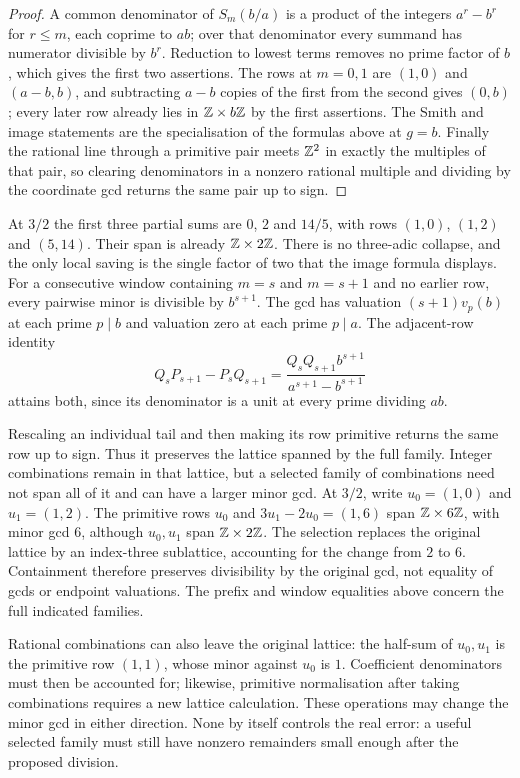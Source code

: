 \documentclass[11pt]{article}
\begin{document}
\begin{proof}
A common denominator of $S_m(b/a)$ is a product of the integers $a^r-b^r$ for
$r\le m$, each coprime to $ab$; over that denominator every summand has
numerator divisible by $b^r$. Reduction to lowest terms removes no prime factor
of $b$, which gives the first two assertions. The rows at $m=0,1$ are $(1,0)$
and $(a-b,b)$, and subtracting $a-b$ copies of the first from the second gives
$(0,b)$; every later row already lies in $\mathbb{Z}\times b\mathbb{Z}$ by the first
assertions. The Smith and image statements are the specialisation of the
formulas above at $g=b$. Finally the rational line through a primitive pair
meets $\mathbb{Z}^2$ in exactly the multiples of that pair, so clearing denominators in
a nonzero rational multiple and dividing by the coordinate gcd returns the same
pair up to sign.
\end{proof}

At $3/2$ the first three partial sums are $0$, $2$ and $14/5$, with rows
$(1,0)$, $(1,2)$ and $(5,14)$. Their span is already $\mathbb{Z}\times2\mathbb{Z}$. There is no
three-adic collapse, and the only local saving is the single factor of two that
the image formula displays. For a consecutive window containing $m=s$ and $m=s+1$ and no
earlier row, every pairwise minor is divisible by $b^{s+1}$.
The gcd has valuation $(s+1)v_p(b)$ at each prime $p\mid b$ and
valuation zero at each prime $p\mid a$. The adjacent-row identity
\[
 Q_sP_{s+1}-P_sQ_{s+1}
 =\frac{Q_sQ_{s+1}b^{s+1}}{a^{s+1}-b^{s+1}}
\]
attains both, since its denominator is a unit at every prime dividing $ab$.

Rescaling an individual tail and then making its row primitive
returns the same row up to sign. Thus it preserves the lattice
spanned by the full family. Integer combinations remain in that
lattice, but a selected family of combinations need not span all
of it and can have a larger minor gcd. At $3/2$, write
$u_0=(1,0)$ and $u_1=(1,2)$. The primitive rows $u_0$ and
$3u_1-2u_0=(1,6)$ span $\mathbb{Z}\times6\mathbb{Z}$, with minor gcd $6$,
although $u_0,u_1$ span $\mathbb{Z}\times2\mathbb{Z}$. The selection replaces the
original lattice by an index-three sublattice, accounting for the
change from $2$ to $6$. Containment therefore preserves divisibility
by the original gcd, not equality of gcds or endpoint valuations. The prefix and window equalities above
concern the full indicated families.

Rational combinations can also leave the original lattice: the
half-sum of $u_0,u_1$ is the primitive row $(1,1)$, whose minor
against $u_0$ is $1$. Coefficient denominators must then be accounted
for; likewise, primitive normalisation after taking combinations
requires a new lattice calculation. These operations may change
the minor gcd in either direction. None by itself controls the
real error: a useful selected family must still have nonzero
remainders small enough after the proposed division.
\end{document}
